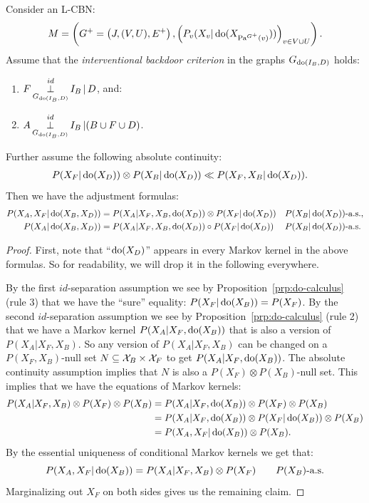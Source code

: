 \begin{Cor}
    \label{cor:backdoor-int}
    Consider an L-CBN:
        \[M= \left ( G^+=\left ( J,(V,U),E^+ \right ), \left ( P_v ( X_v|\operatorname{do}( X_{\mathrm{Pa}^{G^+}(v)})) \right )_{v \in V \cup U} \right ).\]
  Assume that the \emph{interventional backdoor criterion} in the graphs $G_{\operatorname{do}(I_B,D)}$ holds:
\begin{enumerate}
    \item $\displaystyle F \operatorname*{\perp}^{id}_{G_{\operatorname{do}(I_B,D)}} I_B  \operatorname*{|} D$, and:
    \item $\displaystyle A \operatorname*{\perp}^{id}_{G_{\operatorname{do}(I_B,D)}} I_B  \operatorname*{|} (B \cup F \cup D)$.
\end{enumerate}
    Further assume the following absolute continuity:
  \begin{align*}
      P(X_F|\operatorname{do}(X_D)) \otimes P(X_B|\operatorname{do}(X_D)) &\ll  P(X_F,X_B|\operatorname{do}(X_D)).
  \end{align*}
Then we have the adjustment formulas: 
\begin{align*}
    P(X_A,X_F|\operatorname{do}(X_B,X_D)) &= P(X_A|X_F,X_B,\operatorname{do}(X_D)) \otimes P(X_F|\operatorname{do}(X_D)) && P(X_B|\operatorname{do}(X_D))\text{-a.s.}, \\
    P(X_A|\operatorname{do}(X_B,X_D)) &= P(X_A|X_F,X_B,\operatorname{do}(X_D)) \circ P(X_F|\operatorname{do}(X_D)) && P(X_B|\operatorname{do}(X_D))\text{-a.s.}
\end{align*}
\begin{proof}
 First, note that ``$\operatorname{do}(X_D)$'' appears in every Markov kernel in the above formulas. So for readability, we will drop it in the following everywhere.

By the first $id$-separation assumption we see by Proposition~\ref{prp:do-calculus} (rule 3) that we have the ``sure'' equality: $P(X_F|\operatorname{do}(X_B)) = P(X_F)$.
By the second $id$-separation assumption we see by Proposition~\ref{prp:do-calculus} (rule 2) that we have a Markov kernel $P(X_A|X_F,\operatorname{do}(X_B))$ that is also a version of $P(X_A|X_F,X_B)$.
So any version of $P(X_A|X_F,X_B)$ can be changed on a $P(X_F,X_B)$-null set $N \subseteq \mathcal{X}_B \times \mathcal{X}_F$ to get $P(X_A|X_F,\operatorname{do}(X_B))$.
The absolute continuity assumption implies that $N$ is also a $P(X_F) \otimes P(X_B)$-null set.
This implies that we have the equations of Markov kernels:
\begin{align*}
        P(X_A|X_F,X_B) \otimes P(X_F) \otimes P(X_B) 
        &= P(X_A|X_F,\operatorname{do}(X_B)) \otimes P(X_F) \otimes P(X_B) \\
        &= P(X_A|X_F,\operatorname{do}(X_B)) \otimes P(X_F|\operatorname{do}(X_B)) \otimes P(X_B) \\
        &= P(X_A,X_F|\operatorname{do}(X_B)) \otimes P(X_B).
\end{align*}
 By the essential uniqueness of conditional Markov kernels we get that:
\[ P(X_A,X_F|\operatorname{do}(X_B)) = P(X_A|X_F,X_B) \otimes P(X_F)  \qquad P(X_B)\text{-a.s.} \]
Marginalizing out $X_F$ on both sides gives us the remaining claim.
\end{proof}
\end{Cor}


